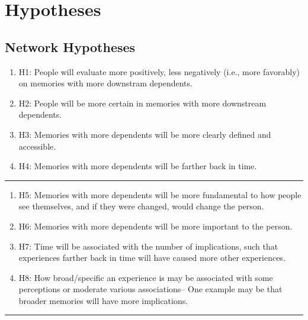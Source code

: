 \documentclass[
  .7em,
  letterpaper,
  DIV=11,
  numbers=noendperiod]{scrartcl}
\begin{document}
\hypertarget{hypotheses}{%
\section{Hypotheses}\label{hypotheses}}

\hypertarget{network-hypotheses}{%
\subsection{Network Hypotheses}\label{network-hypotheses}}

\begin{enumerate}
\def\labelenumi{\arabic{enumi}.}
\item
  H1: People will evaluate more positively, less negatively (i.e., more
  favorably) on memories with more downstram dependents.
\item
  H2: People will be more certain in memories with more downstream
  dependents.
\item
  H3: Memories with more dependents will be more clearly defined and
  accessible.
\item
  H4: Memories with more dependents will be farther back in time.
\end{enumerate}

\begin{center}\rule{0.5\linewidth}{0.5pt}\end{center}

\begin{enumerate}
\def\labelenumi{\arabic{enumi}.}
\setcounter{enumi}{4}
\item
  H5: Memories with more dependents will be more fundamental to how
  people see themselves, and if they were changed, would change the
  person.
\item
  H6: Memories with more dependents will be more important to the
  person.
\item
  H7: Time will be associated with the number of implications, such that
  experiences farther back in time will have caused more other
  experiences.
\item
  H8: How broad/specific an experience is may be associated with some
  perceptions or moderate various associations-- One example may be that
  broader memories will have more implications.
\end{enumerate}

\begin{center}\rule{0.5\linewidth}{0.5pt}\end{center}
\end{document}
